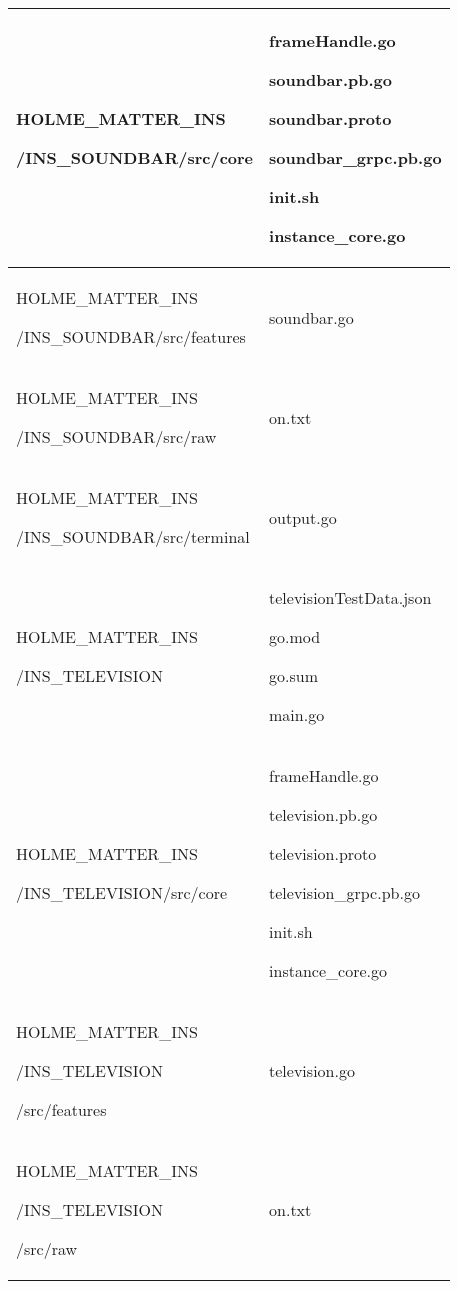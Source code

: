 \documentclass[conference]{IEEEtran}
\begin{document}
\begin{table}[h]
\begin{tabular}{|p{3.9cm}|p{3.9cm}|}
          HOLME\_MATTER\_INS\par/INS\_SOUNDBAR/src/core & frameHandle.go\par soundbar.pb.go\par soundbar.proto\par soundbar\_grpc.pb.go\par init.sh\par instance\_core.go\\ \hline
          HOLME\_MATTER\_INS\par/INS\_SOUNDBAR/src/features& soundbar.go\\ \hline
          HOLME\_MATTER\_INS\par/INS\_SOUNDBAR/src/raw& on.txt\\ \hline
          HOLME\_MATTER\_INS\par/INS\_SOUNDBAR/src/terminal& output.go\\ \hline
          HOLME\_MATTER\_INS\par/INS\_TELEVISION & televisionTestData.json\par go.mod\par go.sum\par main.go\\ \hline
          HOLME\_MATTER\_INS\par/INS\_TELEVISION/src/core & frameHandle.go\par television.pb.go\par television.proto\par television\_grpc.pb.go\par init.sh\par instance\_core.go\\ \hline
          HOLME\_MATTER\_INS\par/INS\_TELEVISION\par /src/features& television.go\\ \hline
          HOLME\_MATTER\_INS\par/INS\_TELEVISION\par /src/raw& on.txt\\ \hline
	\end{tabular}
\end{table}
\end{document}
